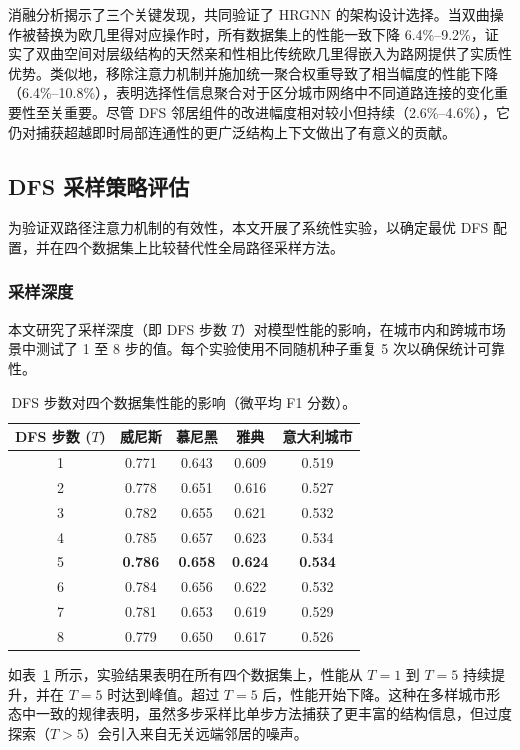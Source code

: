 消融分析揭示了三个关键发现，共同验证了 HRGNN 的架构设计选择。当双曲操作被替换为欧几里得对应操作时，所有数据集上的性能一致下降 6.4\%--9.2\%，证实了双曲空间对层级结构的天然亲和性相比传统欧几里得嵌入为路网提供了实质性优势。类似地，移除注意力机制并施加统一聚合权重导致了相当幅度的性能下降（6.4\%--10.8\%），表明选择性信息聚合对于区分城市网络中不同道路连接的变化重要性至关重要。尽管 DFS 邻居组件的改进幅度相对较小但持续（2.6\%--4.6\%），它仍对捕获超越即时局部连通性的更广泛结构上下文做出了有意义的贡献。

\subsection{DFS 采样策略评估}

为验证双路径注意力机制的有效性，本文开展了系统性实验，以确定最优 DFS 配置，并在四个数据集上比较替代性全局路径采样方法。

\subsubsection{采样深度}

本文研究了采样深度（即 DFS 步数 $T$）对模型性能的影响，在城市内和跨城市场景中测试了 1 至 8 步的值。每个实验使用不同随机种子重复 5 次以确保统计可靠性。

\begin{table}[H]
\centering
\caption{DFS 步数对四个数据集性能的影响（微平均 F1 分数）。}
\label{tab:dfs_steps}
\footnotesize
\begin{tabular}{@{}ccccc@{}}
\toprule
\textbf{DFS 步数 ($T$)} & \textbf{威尼斯} & \textbf{慕尼黑} & \textbf{雅典} & \textbf{意大利城市} \\
\midrule
1 & 0.771 & 0.643 & 0.609 & 0.519 \\
2 & 0.778 & 0.651 & 0.616 & 0.527 \\
3 & 0.782 & 0.655 & 0.621 & 0.532 \\
4 & 0.785 & 0.657 & 0.623 & 0.534 \\
5 & \textbf{0.786} & \textbf{0.658} & \textbf{0.624} & \textbf{0.534} \\
6 & 0.784 & 0.656 & 0.622 & 0.532 \\
7 & 0.781 & 0.653 & 0.619 & 0.529 \\
8 & 0.779 & 0.650 & 0.617 & 0.526 \\
\bottomrule
\end{tabular}
\end{table}

如表~\ref{tab:dfs_steps} 所示，实验结果表明在所有四个数据集上，性能从 $T=1$ 到 $T=5$ 持续提升，并在 $T=5$ 时达到峰值。超过 $T=5$ 后，性能开始下降。这种在多样城市形态中一致的规律表明，虽然多步采样比单步方法捕获了更丰富的结构信息，但过度探索（$T>5$）会引入来自无关远端邻居的噪声。

